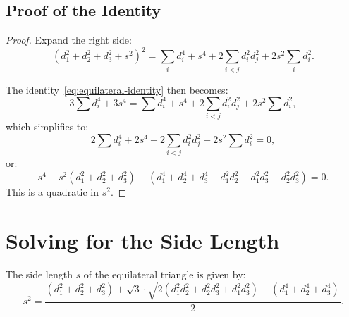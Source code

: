 \subsection{Proof of the Identity}

\begin{proof}
Expand the right side:
\begin{equation}
(d_1^2 + d_2^2 + d_3^2 + s^2)^2 = \sum_i d_i^4 + s^4 + 2\sum_{i < j} d_i^2 d_j^2 + 2s^2 \sum_i d_i^2.
\end{equation}

The identity~\eqref{eq:equilateral-identity} then becomes:
\begin{equation}
3\sum d_i^4 + 3s^4 = \sum d_i^4 + s^4 + 2\sum_{i<j} d_i^2 d_j^2 + 2s^2 \sum d_i^2,
\end{equation}
which simplifies to:
\begin{equation}
\label{eq:equilateral-quadratic}
2\sum d_i^4 + 2s^4 - 2\sum_{i<j} d_i^2 d_j^2 - 2s^2 \sum d_i^2 = 0,
\end{equation}
or:
\begin{equation}
s^4 - s^2(d_1^2 + d_2^2 + d_3^2) + (d_1^4 + d_2^4 + d_3^4 - d_1^2 d_2^2 - d_1^2 d_3^2 - d_2^2 d_3^2) = 0.
\end{equation}
This is a quadratic in $s^2$.
\end{proof}

\section{Solving for the Side Length}

\begin{theorem}
\label{thm:equilateral-formula}
The side length $s$ of the equilateral triangle is given by:
\begin{equation}
\label{eq:s-formula}
s^2 = \frac{(d_1^2 + d_2^2 + d_3^2) + \sqrt{3} \cdot \sqrt{2(d_1^2 d_2^2 + d_2^2 d_3^2 + d_1^2 d_3^2) - (d_1^4 + d_2^4 + d_3^4)}}{2}.
\end{equation}
\end{theorem}

